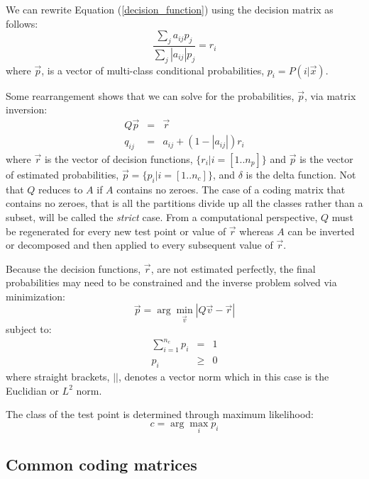\documentclass{article}
\begin{document}
We can rewrite Equation (\ref{decision_function}) using the decision
matrix as follows:
\begin{equation}
	\frac{\sum_j a_{ij} p_j}{\sum_j |a_{ij}| p_j} = r_i
\end{equation}
where $\vec p$, is a vector of multi-class conditional probabilities, $p_i=P(i|\vec x)$.

Some rearrangement shows that
we can solve for the probabilities, $\vec p$, via matrix inversion:
\begin{eqnarray}
	Q \vec p & = & \vec r \\
	q_{ij} & = & a_{ij} + (1-|a_{ij}|) r_i 
	\label{matrix_inverse2}
\end{eqnarray}
where $\vec r$ is the vector of decision functions, $\lbrace r_i| i=[1..n_p]\rbrace$ and
$\vec p$ is the vector of estimated probabilities, $\vec p =\lbrace p_i | i=[1..n_c]\rbrace$, and $\delta$ is the delta function.
Not that $Q$ reduces to $A$ if $A$ contains no zeroes.
The case of a coding matrix that contains no zeroes, that is all the partitions divide up all the
classes rather than a subset, will be called the {\it strict} case.
From a computational perspective, 
$Q$ must be regenerated for every new test point or value of $\vec r$ 
whereas $A$ can be inverted or decomposed and then
applied to every subsequent value of $\vec r$.

Because the decision functions, $\vec r$, are not estimated perfectly,
the final probabilities may need to be constrained and the inverse
problem solved via minimization:
\begin{equation}
	\vec p = \arg \min_{\vec v} | Q \vec v - \vec r |
\end{equation}
subject to:
\begin{eqnarray}
	\sum_{i=1}^{n_c} p_i & = & 1 \\
	p_i & \ge & 0
\end{eqnarray}
where straight brackets, $||$, denotes a vector norm which  
in this case is the Euclidian or $L^2$ norm.

The class of the test point is determined through maximum likelihood:
\begin{equation}
	c = \arg \max_i p_i
\end{equation}

\subsection{Common coding matrices}
\end{document}
